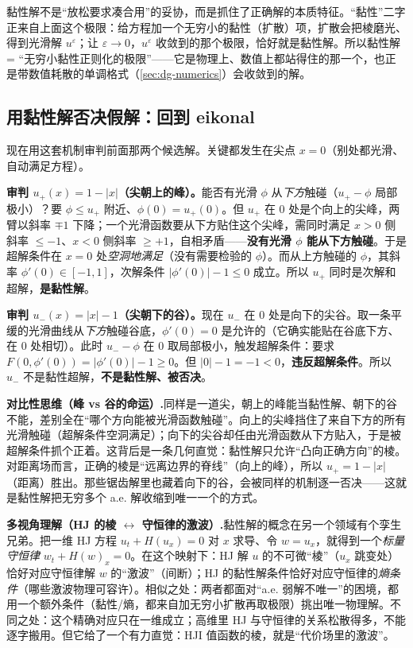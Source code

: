 \begin{insight}
黏性解不是“放松要求凑合用”的妥协，而是抓住了正确解的本质特征。“黏性”二字正来自上面这个极限：给方程加一个无穷小的黏性（扩散）项，扩散会把棱磨光、得到光滑解 $u^\varepsilon$；让 $\varepsilon\to0$，$u^\varepsilon$ 收敛到的那个极限，恰好就是黏性解。所以黏性解 = “无穷小黏性正则化的极限”——它是物理上、数值上都站得住的那一个，也正是带数值耗散的单调格式（\cref{sec:dg-numerics}）会收敛到的解。
\end{insight}

\subsection{用黏性解否决假解：回到 eikonal}
\label{sec:dg-eikonal-judge}
现在用这套机制审判前面那两个候选解。关键都发生在尖点 $x=0$（别处都光滑、自动满足方程）。

\textbf{审判 $u_+(x)=1-|x|$（尖朝上的峰）。}\;能否有光滑 $\phi$ 从\emph{下方}触碰（$u_+-\phi$ 局部极小）？要 $\phi\le u_+$ 附近、$\phi(0)=u_+(0)$。但 $u_+$ 在 $0$ 处是个向上的尖峰，两臂以斜率 $\mp1$ 下降；一个光滑函数要从下方贴住这个尖峰，需同时满足 $x>0$ 侧斜率 $\le-1$、$x<0$ 侧斜率 $\ge+1$，自相矛盾——\textbf{没有光滑 $\phi$ 能从下方触碰}。于是超解条件在 $x=0$ 处\emph{空洞地满足}（没有需要检验的 $\phi$）。而从上方触碰的 $\phi$，其斜率 $\phi'(0)\in[-1,1]$，次解条件 $|\phi'(0)|-1\le 0$ 成立。所以 $u_+$ 同时是次解和超解，\textbf{是黏性解}。

\textbf{审判 $u_-(x)=|x|-1$（尖朝下的谷）。}\;现在 $u_-$ 在 $0$ 处是向下的尖谷。取一条平缓的光滑曲线从\emph{下方}触碰谷底，$\phi'(0)=0$ 是允许的（它确实能贴在谷底下方、在 $0$ 处相切）。此时 $u_--\phi$ 在 $0$ 取局部极小，触发超解条件：要求 $F(0,\phi'(0))=|\phi'(0)|-1\ge 0$。但 $|0|-1=-1<0$，\textbf{违反超解条件}。所以 $u_-$ 不是黏性超解，\textbf{不是黏性解、被否决}。

\begin{note}
\textbf{对比性思维（峰 vs 谷的命运）.}\;同样是一道尖，朝上的峰能当黏性解、朝下的谷不能，差别全在“哪个方向能被光滑函数触碰”。向上的尖峰挡住了来自下方的所有光滑触碰（超解条件空洞满足）；向下的尖谷却任由光滑函数从下方贴入，于是被超解条件抓个正着。这背后是一条几何直觉：黏性解只允许“凸向正确方向”的棱。对距离场而言，正确的棱是“远离边界的脊线”（向上的峰），所以 $u_+=1-|x|$（距离）胜出。那些锯齿解里也藏着向下的谷，会被同样的机制逐一否决——这就是黏性解把无穷多个 a.e. 解收缩到唯一一个的方式。
\end{note}

\begin{note}
\textbf{多视角理解（HJ 的棱 $\leftrightarrow$ 守恒律的激波）.}\;黏性解的概念在另一个领域有个孪生兄弟。把一维 HJ 方程 $u_t+H(u_x)=0$ 对 $x$ 求导、令 $w=u_x$，就得到一个\emph{标量守恒律} $w_t+H(w)_x=0$。在这个映射下：HJ 解 $u$ 的不可微“棱”（$u_x$ 跳变处）恰好对应守恒律解 $w$ 的“激波”（间断）；HJ 的黏性解条件恰好对应守恒律的\emph{熵条件}（哪些激波物理可容许）。相似之处：两者都面对“a.e. 弱解不唯一”的困境，都用一个额外条件（黏性/熵，都来自加无穷小扩散再取极限）挑出唯一物理解。不同之处：这个精确对应只在一维成立；高维里 HJ 与守恒律的关系松散得多，不能逐字搬用。但它给了一个有力直觉：HJI 值函数的棱，就是“代价场里的激波”。
\end{note}

